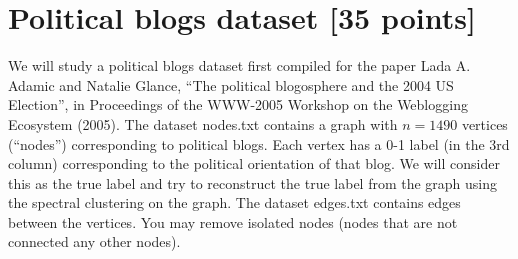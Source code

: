 \documentclass[twoside,10pt]{article}
\begin{document}
\section{Political blogs dataset [35 points] }

We will study a political blogs dataset first compiled for the paper Lada A. Adamic and Natalie Glance, ``The political blogosphere and the 2004 US Election'', in Proceedings of the WWW-2005 Workshop on the Weblogging Ecosystem (2005). The dataset \textsf{nodes.txt} contains a graph with $n = 1490$ vertices (``nodes'') corresponding to political blogs. Each vertex has a 0-1 label (in the 3rd column) corresponding to the political orientation of that blog. We will consider this as the true label and try to reconstruct the true label from the graph using the spectral clustering on the graph. The dataset \textsf{edges.txt} contains edges between the vertices. You may remove isolated nodes (nodes that are not connected any other nodes). 
\end{document}
